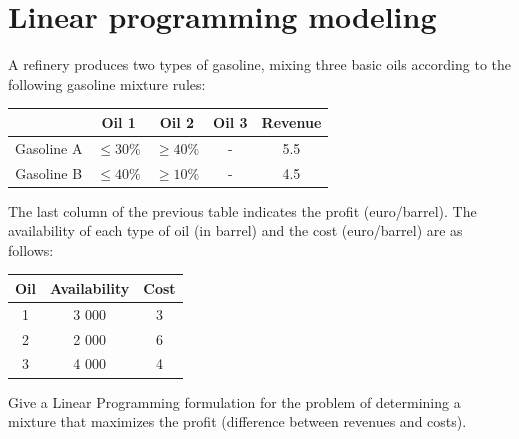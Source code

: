 \documentclass[12pt, a4paper]{report}
\begin{document}
    \newpage

    \section{Linear programming modeling}
        A refinery produces two types of gasoline, mixing three basic oils according to the following gasoline mixture rules:
        \begin{table}[H]
            \centering
            \begin{tabular}{c|ccc|c|}
            \cline{2-5}
            \textbf{}                        & \textbf{Oil 1} & \textbf{Oil 2} & \textbf{Oil 3} & \textbf{Revenue} \\ \hline
            \multicolumn{1}{|c|}{Gasoline A} & $\leq 30\%$    & $\geq 40\%$    & -              & 5.5              \\
            \multicolumn{1}{|c|}{Gasoline B} & $\leq 40\%$    & $\geq 10\%$    & -              & 4.5              \\ \hline
            \end{tabular}
        \end{table}
        The last column of the previous table indicates the profit (euro/barrel). The availability of each type of oil (in barrel) and the cost (euro/barrel) are as follows:
        \begin{table}[H]
            \centering
            \begin{tabular}{c|c|c}
            \textbf{Oil} & \textbf{Availability} & \textbf{Cost} \\ \hline
            1            & 3 000                 & 3             \\
            2            & 2 000                 & 6             \\
            3            & 4 000                 & 4            
            \end{tabular}
        \end{table}
        Give a Linear Programming formulation for the problem of determining a mixture that maximizes the profit (difference between revenues and costs).
\end{document}
